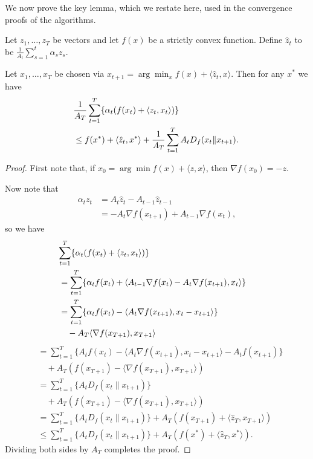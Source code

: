 \documentclass[reqno,oneside,a4paper]{amsart}
\begin{document}
We now prove the key lemma, which we restate here, used in the convergence proofs of the \bmd algorithms.  
\begin{lemma}
\label{lem:bregman}
Let $z_1,\ldots,z_T$ be vectors and let $f(x)$ be a strictly convex 
function. Define $\hat{z}_t$ to be $\frac{1}{A_t} \sum_{s=1}^t \alpha_s z_s$.

Let $x_1,\ldots,x_T$ be chosen via $x_{t+1} = \arg\min_{x} f(x) + \langle \hat{z}_t, x\rangle$. 
Then for any $x^*$ we have
\begin{align*}
\lefteqn{\frac{1}{A_T} \sum_{t=1}^T \{\alpha_t(f(x_t) + \langle z_t, x_t \rangle)\}} \\
\phantom{+} &\leq f(x^*) + \langle \hat{z}_t, x^* \rangle + \frac{1}{A_T} \sum_{t=1}^T A_t D_{f}(x_t \| x_{t+1}). 
\end{align*}
\end{lemma}
\begin{proof}
First note that, if $x_0 = \arg\min f(x) + \langle z, x \rangle$, 
then $\nabla f(x_0) = -z$.


Now note that
\begin{align}
\alpha_{t}z_{t} 
&= A_{t}\hat z_{t} - A_{t-1}\hat z_{t-1} \\
&= - A_{t}\nabla f(x_{t+1}) + A_{t-1} \nabla f(x_{t}),
\end{align}
so we have
\begin{align}
\lefteqn{\sum_{t=1}^T \{\alpha_t(f(x_t) + \langle z_t, x_t \rangle)\}} \\
 &= \sum_{t=1}^T \{\alpha_t f(x_t) + \langle A_{t-1} \nabla f(x_t) - A_t \nabla f(x_{t+1}), x_t \rangle\} \\
 &= \sum_{t=1}^T \{\alpha_t f(x_t) - \langle A_{t} \nabla f(x_{t+1}), x_t-x_{t+1} \rangle\} \\
 & \quad - A_{T}\langle \nabla f(x_{T+1}), x_{T+1} \rangle
\end{align}
\begin{align}
 &= \sum_{t=1}^T \{A_t f(x_t) - \langle A_{t} \nabla f(x_{t+1}), x_t-x_{t+1} \rangle - A_t f(x_{t+1})\}  \\
 &\quad+ A_T(f(x_{T+1}) - \langle \nabla f(x_{T+1}), x_{T+1} \rangle) \nonumber \\
 &= \sum_{t=1}^T \{A_tD_f(x_t \| x_{t+1})\}  \\
 &\quad+ A_T(f(x_{T+1}) - \langle \nabla f(x_{T+1}), x_{T+1} \rangle) \nonumber \\
 &= \sum_{t=1}^T \{A_tD_f(x_t \| x_{t+1})\} + A_T(f(x_{T+1}) + \langle \hat{z}_T, x_{T+1} \rangle) \\
 &\leq \sum_{t=1}^T \{A_tD_f(x_t \| x_{t+1})\} + A_T(f(x^*) + \langle \hat{z}_T, x^* \rangle). 
\end{align}
Dividing both sides by $A_T$ completes the proof.
\end{proof}
\end{document}
